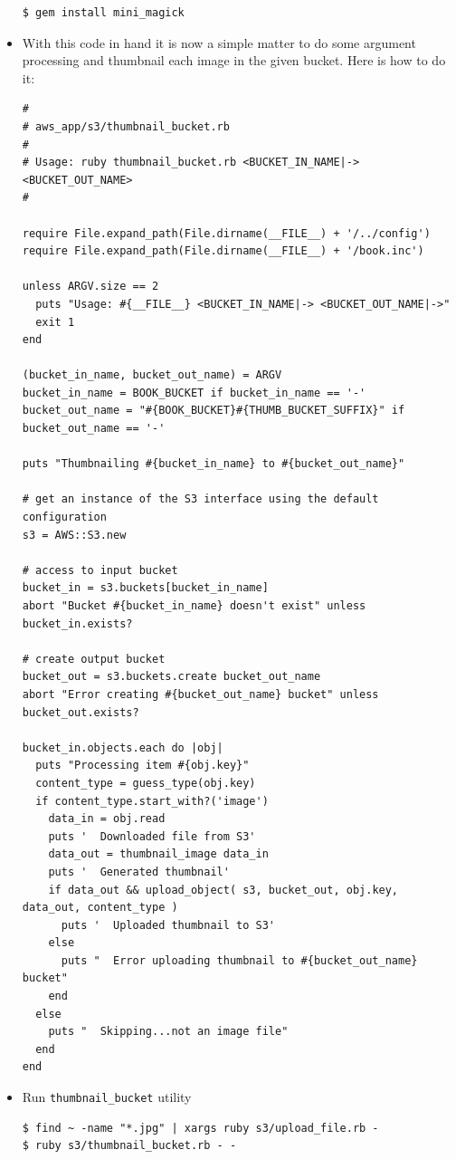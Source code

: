 \documentclass{beamer}
\begin{document}
\begin{frame}
\begin{itemize}
\lstset{language=shell}
\begin{lstlisting}[escapechar=!]
$ gem install mini_magick
\end{lstlisting}


\item With this code in hand it is now a simple matter to do some argument processing
and thumbnail each image in the given bucket. Here is how to do it:
\lstset{language=Ruby, style=eclipse}
\begin{lstlisting}[escapechar=!]
#
# aws_app/s3/thumbnail_bucket.rb
#
# Usage: ruby thumbnail_bucket.rb <BUCKET_IN_NAME|-> <BUCKET_OUT_NAME>
#

require File.expand_path(File.dirname(__FILE__) + '/../config')
require File.expand_path(File.dirname(__FILE__) + '/book.inc')

unless ARGV.size == 2
  puts "Usage: #{__FILE__} <BUCKET_IN_NAME|-> <BUCKET_OUT_NAME|->"
  exit 1
end

(bucket_in_name, bucket_out_name) = ARGV
bucket_in_name = BOOK_BUCKET if bucket_in_name == '-'
bucket_out_name = "#{BOOK_BUCKET}#{THUMB_BUCKET_SUFFIX}" if bucket_out_name == '-'

puts "Thumbnailing #{bucket_in_name} to #{bucket_out_name}"

# get an instance of the S3 interface using the default configuration
s3 = AWS::S3.new

# access to input bucket
bucket_in = s3.buckets[bucket_in_name]
abort "Bucket #{bucket_in_name} doesn't exist" unless bucket_in.exists?

# create output bucket
bucket_out = s3.buckets.create bucket_out_name
abort "Error creating #{bucket_out_name} bucket" unless bucket_out.exists?

bucket_in.objects.each do |obj|
  puts "Processing item #{obj.key}"
  content_type = guess_type(obj.key)
  if content_type.start_with?('image')
    data_in = obj.read
    puts '  Downloaded file from S3'
    data_out = thumbnail_image data_in
    puts '  Generated thumbnail'
    if data_out && upload_object( s3, bucket_out, obj.key, data_out, content_type )
      puts '  Uploaded thumbnail to S3'
    else
      puts "  Error uploading thumbnail to #{bucket_out_name} bucket"
    end
  else
    puts "  Skipping...not an image file"
  end
end
\end{lstlisting}

\item Run \texttt{thumbnail\_bucket} utility
\lstset{language=shell}
\begin{lstlisting}[escapechar=!]
$ find ~ -name "*.jpg" | xargs ruby s3/upload_file.rb -
$ ruby s3/thumbnail_bucket.rb - -
\end{lstlisting}

\end{itemize}
\end{frame}
\end{document}
